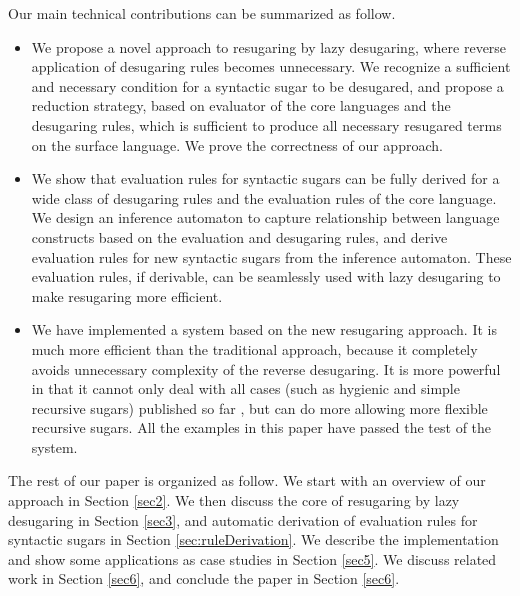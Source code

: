 Our main technical contributions can be summarized as follow.
\begin{itemize}
\item We propose a novel approach to resugaring by lazy desugaring, where reverse application of desugaring rules becomes unnecessary. We recognize a sufficient and necessary condition for a syntactic sugar to be desugared, and propose a reduction strategy, based on evaluator of the core languages and the desugaring rules, which is sufficient to produce all necessary resugared terms on the surface language. We prove the correctness of our approach.



\item We show that evaluation rules for syntactic sugars can be fully derived for a wide  class of desugaring rules and the evaluation rules of the core language. We design an inference automaton to capture relationship between language constructs based on   the evaluation and desugaring rules, and derive evaluation rules for new syntactic sugars from the inference automaton. These evaluation rules, if derivable, can be seamlessly used with lazy desugaring to make resugaring more efficient.



\item We have implemented a system based on the new resugaring approach. It is much more efficient than the traditional approach, because it completely avoids unnecessary complexity of the reverse desugaring. It is more powerful in that it cannot only deal with all cases (such as hygienic and simple recursive sugars) published so far \cite{resugaring,hygienic}, but can do more allowing more flexible recursive sugars. All the examples in this paper have passed the test of the system.


\end{itemize}

The rest of our paper is organized as follow. We start with an overview of our approach in Section \ref{sec2}. We then discuss the core of resugaring by lazy desugaring in Section \ref{sec3}, and automatic derivation of evaluation rules for syntactic sugars in Section \ref{sec:ruleDerivation}. We describe the implementation and show some applications as case studies in Section \ref{sec5}. We discuss related  work in Section \ref{sec6}, and conclude the paper in Section \ref{sec6}.
